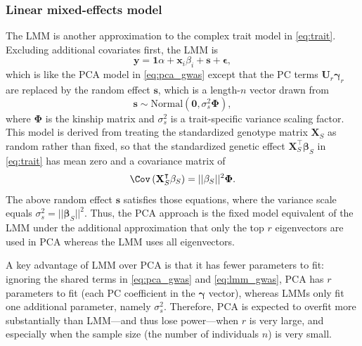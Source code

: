 \documentclass[11pt]{article}
\begin{document}
\subsubsection{Linear mixed-effects model}

The LMM is another approximation to the complex trait model in \cref{eq:trait}.
Excluding additional covariates first, the LMM is
\begin{equation}
  \label{eq:lmm_gwas}
  \mathbf{y}
  =
  \mathbf{1} \alpha + \mathbf{x}_i \beta_i + \mathbf{s} + \mathbf{\epsilon}
  ,
\end{equation}
which is like the PCA model in \cref{eq:pca_gwas} except that the PC terms $\mathbf{U}_r \mathbf{\gamma}_r$ are replaced by the random effect $\mathbf{s}$, which is a length-$n$ vector drawn from
$$
\mathbf{s} \sim \text{Normal} \left( \mathbf{0}, \sigma^2_s \mathbf{\Phi} \right),
$$
where $\mathbf{\Phi}$ is the kinship matrix and $\sigma^2_s$ is a trait-specific variance scaling factor.
This model is derived from treating the standardized genotype matrix $\mathbf{X}_S$ as random rather than fixed, so that the standardized genetic effect
$\mathbf{X}_S^\intercal \mathbf{\beta}_S$
in \cref{eq:trait} has mean zero and a covariance matrix of
$$
\Cov \left( \mathbf{X}_S^\intercal \mathbf{\beta}_S \right)
=
|| \mathbf{\beta}_S ||^2 \mathbf{\Phi}
.
$$
The above random effect $\mathbf{s}$ satisfies those equations, where the variance scale equals $\sigma^2_s = || \mathbf{\beta}_S ||^2$.
Thus, the PCA approach is the fixed model equivalent of the LMM under the additional approximation that only the top $r$ eigenvectors are used in PCA whereas the LMM uses all eigenvectors.

A key advantage of LMM over PCA is that it has fewer parameters to fit: ignoring the shared terms in \cref{eq:pca_gwas} and \cref{eq:lmm_gwas}, PCA has $r$ parameters to fit (each PC coefficient in the $\mathbf{\gamma}$ vector), whereas LMMs only fit one additional parameter, namely $\sigma^2_s$.
Therefore, PCA is expected to overfit more substantially than LMM---and thus lose power---when $r$ is very large, and especially when the sample size (the number of individuals $n$) is very small.
\end{document}
